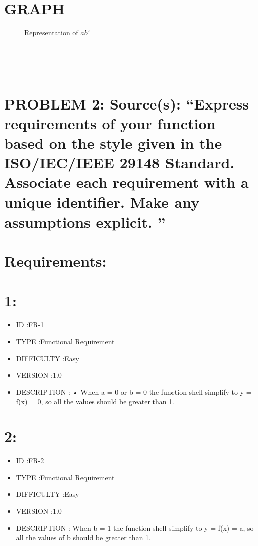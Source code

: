 \documentclass[10pt]{article}
\begin{document}
\section*{\normalsize \textbf{GRAPH}}
\begin{figure}
    \centering
    \qquad
    \caption{Representation of $ab^x$ }
\end{figure}
\\
\\
\\
\pagebreak
\section*{{\normalsize PROBLEM 2: Source(s): “Express requirements of your function based on the style given in the ISO/IEC/IEEE
29148 Standard. Associate each requirement with a unique identifier. Make any assumptions explicit. ” }}
\section*{Requirements:}
\section*{1:}
\begin{itemize}
  \item ID			:FR-1
  \item TYPE		:Functional Requirement
  \item DIFFICULTY	:Easy
  \item VERSION		:1.0
  \item DESCRIPTION	: •	When  a = 0  or  b = 0  the function shell simplify to  y = f(x) = 0, so all the values should be greater than 1.
\end{itemize}
\section*{2:}
\begin{itemize}
  \item ID			:FR-2
  \item TYPE		:Functional Requirement
  \item DIFFICULTY	:Easy
  \item VERSION		:1.0
  \item DESCRIPTION	: When  b = 1  the function shell simplify to  y = f(x) = a,  so all the values of b should be greater than 1.

\end{itemize}
\end{document}
